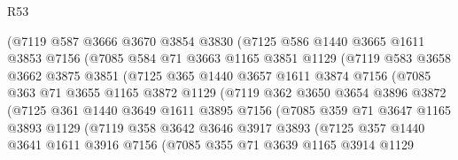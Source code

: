 \begin{lexlean}{R53}
\begin{coremodule}
              (@7119
                @587
                @3666
                @3670
                @3854
                @3830
                (@7125
                  @586
                  @1440
                  @3665
                  @1611
                  @3853
                  @7156
                  (@7085
                    @584
                    @71
                    @3663
                    @1165
                    @3851
                    @1129
                    (@7119
                      @583
                      @3658
                      @3662
                      @3875
                      @3851
                      (@7125
                        @365
                        @1440
                        @3657
                        @1611
                        @3874
                        @7156
                        (@7085
                          @363
                          @71
                          @3655
                          @1165
                          @3872
                          @1129
                          (@7119
                            @362
                            @3650
                            @3654
                            @3896
                            @3872
                            (@7125
                              @361
                              @1440
                              @3649
                              @1611
                              @3895
                              @7156
                              (@7085
                                @359
                                @71
                                @3647
                                @1165
                                @3893
                                @1129
                                (@7119
                                  @358
                                  @3642
                                  @3646
                                  @3917
                                  @3893
                                  (@7125
                                    @357
                                    @1440
                                    @3641
                                    @1611
                                    @3916
                                    @7156
                                    (@7085
                                      @355
                                      @71
                                      @3639
                                      @1165
                                      @3914
                                      @1129

\end{coremodule}
\end{lexlean}
